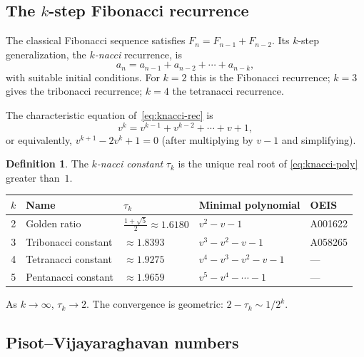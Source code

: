 \documentclass[11pt]{article}
\theoremstyle{definition}
\newtheorem{definition}[theorem]{Definition}
\theoremstyle{remark}
\begin{document}
\subsection{The \texorpdfstring{$k$}{k}-step Fibonacci recurrence}

The classical Fibonacci sequence satisfies $F_n = F_{n-1} + F_{n-2}$.
Its $k$-step generalization, the \emph{$k$-nacci} recurrence, is
\begin{equation}\label{eq:knacci-rec}
a_n = a_{n-1} + a_{n-2} + \cdots + a_{n-k},
\end{equation}
with suitable initial conditions.
For $k = 2$ this is the Fibonacci recurrence; $k = 3$ gives the
tribonacci recurrence; $k = 4$ the tetranacci recurrence.

The characteristic equation of~\eqref{eq:knacci-rec} is
\begin{equation}\label{eq:knacci-poly}
v^k = v^{k-1} + v^{k-2} + \cdots + v + 1,
\end{equation}
or equivalently, $v^{k+1} - 2v^k + 1 = 0$ (after multiplying by
$v - 1$ and simplifying).

\begin{definition}\label{def:knacci}
The \emph{$k$-nacci constant} $\tau_k$ is the unique real root of
\eqref{eq:knacci-poly} greater than~$1$.
\end{definition}

\begin{center}
\begin{tabular}{cllll}
\toprule
$k$ & Name & $\tau_k$ & Minimal polynomial & OEIS \\
\midrule
2 & Golden ratio & $\frac{1+\sqrt{5}}{2} \approx 1.6180$ &
    $v^2 - v - 1$ & A001622 \\
3 & Tribonacci constant & $\approx 1.8393$ &
    $v^3 - v^2 - v - 1$ & A058265 \\
4 & Tetranacci constant & $\approx 1.9275$ &
    $v^4 - v^3 - v^2 - v - 1$ & --- \\
5 & Pentanacci constant & $\approx 1.9659$ &
    $v^5 - v^4 - \cdots - 1$ & --- \\
\bottomrule
\end{tabular}
\end{center}

As $k \to \infty$, $\tau_k \to 2$.
The convergence is geometric: $2 - \tau_k \sim 1/2^k$.

\subsection{Pisot--Vijayaraghavan numbers}
\end{document}
